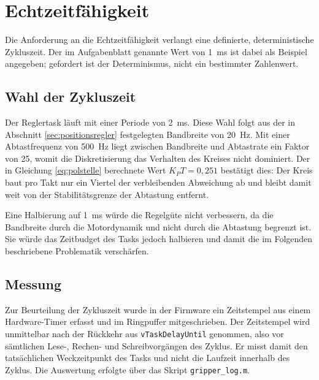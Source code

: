 
\section{Echtzeitfähigkeit}
\label{sec:ergebnis_echtzeit}

Die Anforderung an die Echtzeitfähigkeit verlangt eine definierte, deterministische
Zykluszeit. Der im Aufgabenblatt genannte Wert von 1~ms ist dabei als Beispiel angegeben;
gefordert ist der Determinismus, nicht ein bestimmter Zahlenwert.

\subsection*{Wahl der Zykluszeit}

Der Reglertask läuft mit einer Periode von 2~ms. Diese Wahl folgt aus der in Abschnitt
\ref{sec:positionsregler} festgelegten Bandbreite von 20~Hz. Mit einer Abtastfrequenz von
500~Hz liegt zwischen Bandbreite und Abtastrate ein Faktor von 25, womit die
Diskretisierung das Verhalten des Kreises nicht dominiert. Der in Gleichung
\ref{eq:polstelle} berechnete Wert $K_P T = 0{,}251$ bestätigt dies: Der Kreis baut pro
Takt nur ein Viertel der verbleibenden Abweichung ab und bleibt damit weit von der
Stabilitätsgrenze der Abtastung entfernt.

Eine Halbierung auf 1~ms würde die Regelgüte nicht verbessern, da die Bandbreite durch die
Motordynamik und nicht durch die Abtastung begrenzt ist. Sie würde das Zeitbudget des
Tasks jedoch halbieren und damit die im Folgenden beschriebene Problematik verschärfen.

\subsection*{Messung}

Zur Beurteilung der Zykluszeit wurde in der Firmware ein Zeitstempel aus einem
Hardware-Timer erfasst und im Ringpuffer mitgeschrieben. Der Zeitstempel wird unmittelbar
nach der Rückkehr aus \texttt{vTaskDelayUntil} genommen, also vor sämtlichen Lese-, Rechen-
und Schreibvorgängen des Zyklus. Er misst damit den tatsächlichen Weckzeitpunkt des Tasks
und nicht die Laufzeit innerhalb des Zyklus. Die Auswertung erfolgte über das Skript
\texttt{gripper\_log.m}.

